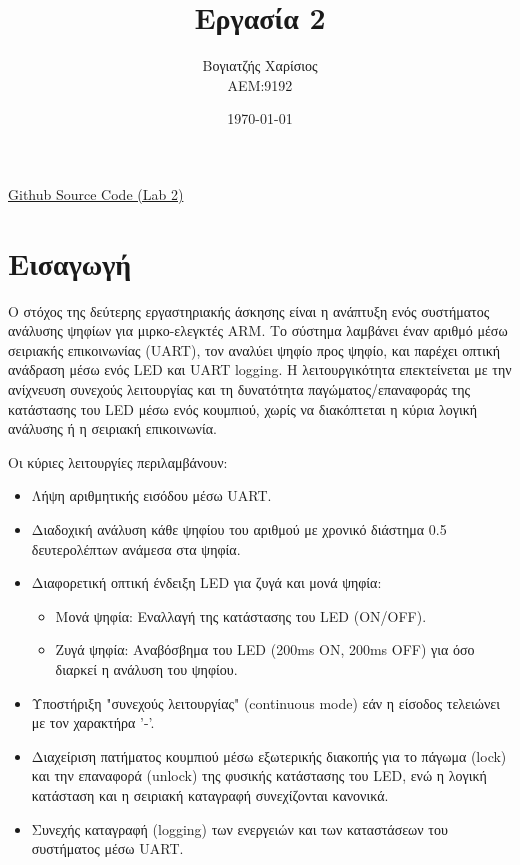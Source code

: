 \documentclass{article}
\title{Εργασία 2}
\author{Βογιατζής Χαρίσιος \\ ΑΕΜ:9192}
\date{\today}
\begin{document}
\maketitle

\begin{center}
\href{https://github.com/charisvt/micro-lab2}{Github Source Code (Lab 2)}
\end{center}

\section{Εισαγωγή}

Ο στόχος της δεύτερης εργαστηριακής άσκησης είναι η ανάπτυξη ενός συστήματος ανάλυσης ψηφίων για μιρκο-ελεγκτές ARM. Το σύστημα λαμβάνει έναν αριθμό μέσω σειριακής επικοινωνίας (UART), τον αναλύει ψηφίο προς ψηφίο, και παρέχει οπτική ανάδραση μέσω ενός LED και UART logging. Η λειτουργικότητα επεκτείνεται με την ανίχνευση συνεχούς λειτουργίας και τη δυνατότητα παγώματος/επαναφοράς της κατάστασης του LED μέσω ενός κουμπιού, χωρίς να διακόπτεται η κύρια λογική ανάλυσης ή η σειριακή επικοινωνία.

Οι κύριες λειτουργίες περιλαμβάνουν:
\begin{itemize}
    \item Λήψη αριθμητικής εισόδου μέσω UART.
    \item Διαδοχική ανάλυση κάθε ψηφίου του αριθμού με χρονικό διάστημα 0.5 δευτερολέπτων ανάμεσα στα ψηφία.
    \item Διαφορετική οπτική ένδειξη LED για ζυγά και μονά ψηφία:
    \begin{itemize}
        \item Μονά ψηφία: Εναλλαγή της κατάστασης του LED (ON/OFF).
        \item Ζυγά ψηφία: Αναβόσβημα του LED (200ms ON, 200ms OFF) για όσο διαρκεί η ανάλυση του ψηφίου.
    \end{itemize}
    \item Υποστήριξη "συνεχούς λειτουργίας" (continuous mode) εάν η είσοδος τελειώνει με τον χαρακτήρα '-'.
    \item Διαχείριση πατήματος κουμπιού μέσω εξωτερικής διακοπής για το πάγωμα (lock) και την επαναφορά (unlock) της φυσικής κατάστασης του LED, ενώ η λογική κατάσταση και η σειριακή καταγραφή συνεχίζονται κανονικά.
    \item Συνεχής καταγραφή (logging) των ενεργειών και των καταστάσεων του συστήματος μέσω UART.
\end{itemize}
\end{document}
